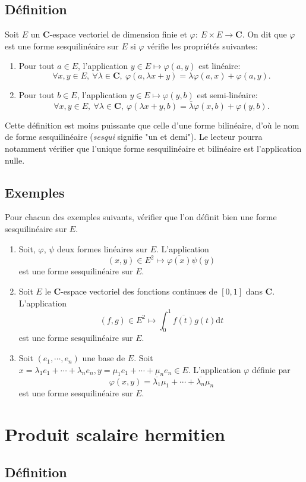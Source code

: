 \documentclass[a4paper,11pt]{article}
\newcommand{\C}{\mathbf{C}}
\begin{document}
\subsection{Définition}
Soit $E$ un $\C$-espace vectoriel de dimension finie et $\varphi:\ E\times E\rightarrow\C$. On dit que $\varphi$ est une {\sffamily\color{vert1}forme sesquilinéaire} sur $E$ si $\varphi$ vérifie les propriétés suivantes:
\begin{enumerate}
\item Pour tout $a\in E$, l'application $y\in E\mapsto\varphi(a,y)$ est linéaire:
\[\forall x,y\in E,\ \forall\lambda\in\C,\ \varphi(a,\lambda x+y)=\lambda\varphi(a,x)+\varphi(a,y).\]
\item Pour tout $b\in E$, l'application $y\in E\mapsto\varphi(y,b)$ est semi-linéaire:
\[\forall x,y\in E,\ \forall\lambda\in\C,\ \varphi(\lambda x+y,b)=\overline{\lambda}\varphi(x,b)+\varphi(y,b).\]
\end{enumerate}
Cette définition est moins puissante que celle d'une forme bilinéaire, d'où le nom de forme sesquilinéaire (\textit{sesqui} signifie "un et demi"). Le lecteur pourra notamment vérifier que l'unique forme sesquilinéaire et bilinéaire est l'application nulle.

\subsection{Exemples}
Pour chacun des exemples suivants, vérifier que l'on définit bien une forme sesquilinéaire sur $E$.
\begin{enumerate}
\item Soit, $\varphi$, $\psi$ deux formes linéaires sur $E$. L'application \[(x,y)\in E^2\mapsto\overline{\varphi(x)}\psi(y)\] est une forme sesquilinéaire sur $E$.
\item Soit $E$ le $\C$-espace vectoriel des fonctions continues de $[0,1]$ dans $\C$. L'application \[(f,g)\in E^2\mapsto\displaystyle\int_{0}^1\overline{f(t)}g(t)\mathrm{d}t\] est une forme sesquilinéaire sur $E$.
\item Soit $(e_1,\cdots, e_n)$ une base de $E$. Soit $x=\lambda_1e_1+\cdots+\lambda_ne_n,y=\mu_1e_1+\cdots+\mu_ne_n\in E$. L'application $\varphi$ définie par  \[\varphi(x,y)=\overline{\lambda_1}\mu_1+\cdots+\overline{\lambda_n}\mu_n\] est une forme sesquilinéaire sur $E$.
\end{enumerate}

\section{Produit scalaire hermitien}
\subsection{Définition}
\end{document}
